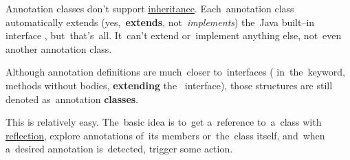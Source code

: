 \warning Annotation classes don't support \hyperref[inheritance]{inheritance}.
Each~annotation class automatically extends (yes,~\textbf{extends}, not~\textit{implements}) the~Java built--in interface , but~that's~all.
It~can't extend or~implement anything else, not~even another annotation class.
\newpage

\warning Although annotation definitions are much~closer to~interfaces ( in~the~keyword, methods without bodies, \textbf{extending} \mbox{the } interface), those structures are still denoted as~annotation \textbf{classes}.

This is relatively easy.
The~basic idea is to~get a~reference to~a~class with \hyperref[reflection]{reflection}, explore annotations of~its members or~the~class itself, and~when a~desired annotation is~detected, trigger some action.

